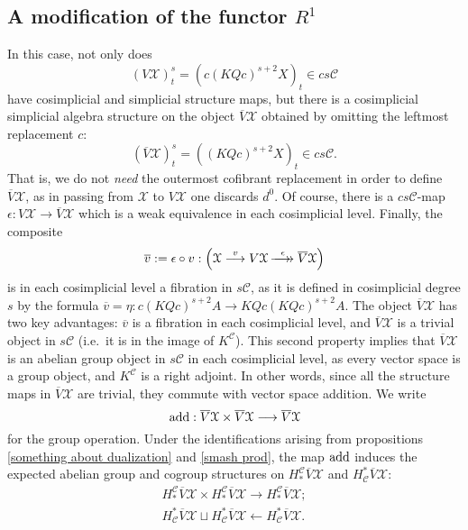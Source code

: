 \documentclass[11pt]{amsart} \renewcommand{\baselinestretch}{1.2}
\theoremstyle{plain}
\theoremstyle{definition}
\renewcommand{\to}{\longrightarrow}
\newcommand{\from}{\longleftarrow}
\newcommand{\calx}{\mathcal{X}}
\newcommand{\calc}{\mathcal{C}}
\newcommand{\epi}{{\,\makebox[0cm][l]{\ensuremath\to}\to{}}}
\newcommand{\Dendo}{R}
\begin{document}
\begin{Operations on the Bousfield-Kan spectral sequence}
\subsection{A modification of the functor $\Dendo^1$}
In this case, not only does
\[(V\calx)^s_t=(c(KQc)^{s+2}X)_t\in cs\calc\]
have cosimplicial and simplicial structure maps,
but there is a cosimplicial simplicial algebra structure on the object $\overline{V}\calx$ obtained by omitting the leftmost replacement $c$:
\[(\overline{V}\calx)^s_t=((KQc)^{s+2}X)_t\in cs\calc.\]
That is, we do not \emph{need} the outermost cofibrant replacement in order to define $\overline{V}\calx$, as in passing from $\calx$ to $V\calx$ one discards $d^0$. Of course, there is a $cs\calc$-map $\epsilon:V\calx \to \overline{V}\calx $ which is a weak equivalence in each cosimplicial level. Finally, the composite
\[\overline{v}:=\epsilon\circ v:\left(\calx\overset{v}{\to}V\calx\overset{\epsilon}{\epi} \overline{V}\calx\right)\]
is in each cosimplicial level a fibration in $s\calc$, as it is defined in cosimplicial degree $s$ by the formula $\overline{v}=\eta:c(KQc)^{s+2}A\to KQc(KQc)^{s+2}A$. The object $\overline{V}\calx$ has two key advantages: $\overline{v}$ is a fibration in each cosimplicial level, and $\overline{V}\calx$ is a trivial object in $s\calc$ (i.e.\ it is in the image of $K^{\calc}$). This second property implies that  $\overline{V}\calx$ is an abelian group object in $s\calc$ in each cosimplicial level, as every vector space is a group object, and $K^{\calc}$ is a right adjoint. In other words, since all the structure maps in $\overline{V}\calx$ are trivial, they commute  with vector space addition. We write
\[\textup{add}:\overline{V}\calx\times \overline{V}\calx\to \overline{V}\calx\]
for the group operation. Under the identifications arising from propositions \ref{something about dualization} and \ref{smash prod}, the map $\textup{add}$ induces the expected abelian group and cogroup structures on $H_*^\calc\overline{V}\calx$ and $H^*_\calc\overline{V}\calx$:
\begin{gather*}
H_*^\calc\overline{V}\calx\times H_*^\calc\overline{V}\calx\to H_*^\calc\overline{V}\calx;\\
H^*_\calc\overline{V}\calx\sqcup H^*_\calc\overline{V}\calx\from H^*_\calc\overline{V}\calx.
\end{gather*}


\end{Operations on the Bousfield-Kan spectral sequence}
\end{document}
